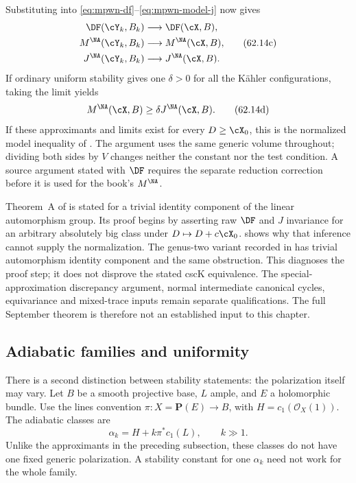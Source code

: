 Substituting into \eqref{eq:mpwn-df}--\eqref{eq:mpwn-model-j}
now gives
\[
 \begin{aligned}
 \DF(\cY_k,B_k)&\longrightarrow\DF(\cX,B),\\
 M^{\NA}(\cY_k,B_k)&\longrightarrow M^{\NA}(\cX,B),\\
 J^{\NA}(\cY_k,B_k)&\longrightarrow J^{\NA}(\cX,B).
 \end{aligned}
 \tag{62.14c}\label{eq:mpwn-special-functional-limits}
\]
If ordinary uniform stability gives one $\delta>0$ for all the
K\"ahler configurations, taking the limit yields
\[
 M^{\NA}(\cX,B)\geq\delta J^{\NA}(\cX,B).
 \tag{62.14d}\label{eq:mpwn-special-normalized-inequality}
\]
If these approximants and limits exist for every $D\geq\cX_0$,
this is the normalized model inequality of
. The argument uses the same
generic volume throughout; dividing both sides by $V$ changes
neither the constant nor the test condition. A source argument
stated with $\DF$ requires the separate reduction correction
before it is used for the book's $M^{\NA}$.

Theorem~A of \cite{Trusiani26TranscendentalV1} is stated for a
trivial identity component of the linear automorphism group.
Its proof begins by asserting raw $\DF$ and $J$ invariance for
an arbitrary absolutely big class under $D\mapsto D+c\cX_0$.
 shows why that inference
cannot supply the normalization. The genus-two variant recorded
in  has trivial
automorphism identity component and the same obstruction.
This diagnoses the proof step; it does not disprove the stated
cscK equivalence. The special-approximation discrepancy argument,
normal intermediate canonical cycles, equivariance and mixed-trace
inputs remain separate qualifications. The full September theorem
is therefore not an established input to this chapter.

\subsection{Adiabatic families and uniformity}
\label{subsec:mpwn-adiabatic-uniformity}

There is a second distinction between stability statements: the
polarization itself may vary. Let $B$ be a smooth projective base,
$L$ ample, and $E$ a holomorphic bundle. Use the lines convention
$\pi:X=\mathbf P(E)\to B$, with $H=c_1(\mathcal O_X(1))$.
The adiabatic classes are
\[
 \alpha_k=H+k\pi^*c_1(L),\qquad k\gg1.
\]
Unlike the approximants in the preceding subsection, these classes
do not have one fixed generic polarization. A stability constant
for one $\alpha_k$ need not work for the whole family.

